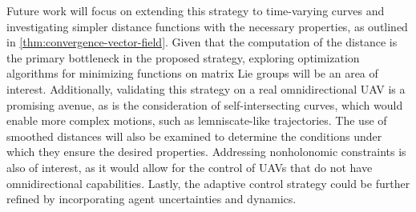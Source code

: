 Future work will focus on extending this strategy to time-varying curves and investigating simpler distance functions with the necessary properties, as outlined in \cref{thm:convergence-vector-field}. Given that the computation of the distance is the primary bottleneck in the proposed strategy, exploring optimization algorithms for minimizing functions on matrix Lie groups will be an area of interest. Additionally, validating this strategy on a real omnidirectional UAV is a promising avenue, as is the consideration of self-intersecting curves, which would enable more complex motions, such as lemniscate-like trajectories. The use of smoothed distances will also be examined to determine the conditions under which they ensure the desired properties. Addressing nonholonomic constraints is also of interest, as it would allow for the control of UAVs that do not have omnidirectional capabilities. Lastly, the adaptive control strategy could be further refined by incorporating agent uncertainties and dynamics.